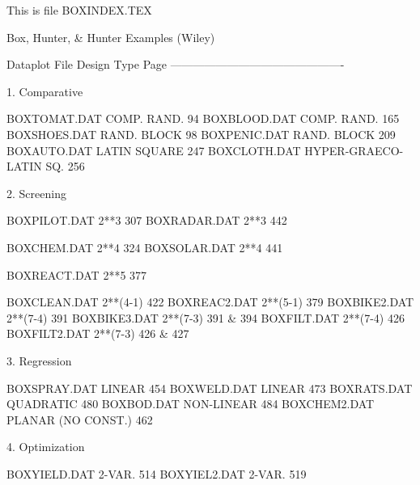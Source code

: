 This is file BOXINDEX.TEX
 
       Box, Hunter, & Hunter Examples (Wiley)
 
   Dataplot File     Design Type             Page
   ----------------------------------------------
 
1. Comparative
 
   BOXTOMAT.DAT      COMP. RAND.               94
   BOXBLOOD.DAT      COMP. RAND.              165
   BOXSHOES.DAT      RAND. BLOCK               98
   BOXPENIC.DAT      RAND. BLOCK              209
   BOXAUTO.DAT       LATIN SQUARE             247
   BOXCLOTH.DAT      HYPER-GRAECO-LATIN SQ.   256
 
2. Screening
 
   BOXPILOT.DAT      2**3                     307
   BOXRADAR.DAT      2**3                     442
 
   BOXCHEM.DAT       2**4                     324
   BOXSOLAR.DAT      2**4                     441
 
   BOXREACT.DAT      2**5                     377
 
   BOXCLEAN.DAT      2**(4-1)                 422
   BOXREAC2.DAT      2**(5-1)                 379
   BOXBIKE2.DAT      2**(7-4)                 391
   BOXBIKE3.DAT      2**(7-3)                 391 & 394
   BOXFILT.DAT       2**(7-4)                 426
   BOXFILT2.DAT      2**(7-3)                 426 & 427
 
3. Regression
 
   BOXSPRAY.DAT      LINEAR                   454
   BOXWELD.DAT       LINEAR                   473
   BOXRATS.DAT       QUADRATIC                480
   BOXBOD.DAT        NON-LINEAR               484
   BOXCHEM2.DAT      PLANAR (NO CONST.)       462
 
4. Optimization
 
   BOXYIELD.DAT      2-VAR.                   514
   BOXYIEL2.DAT      2-VAR.                   519
